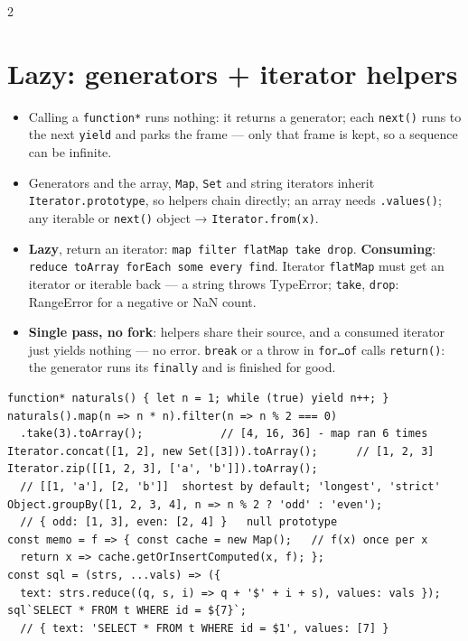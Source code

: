 \documentclass[8pt]{extarticle}
\begin{document}
\begin{multicols}{2}
\section{Lazy: generators + iterator helpers}
\begin{itemize}
  \item Calling a \texttt{function*} runs nothing: it returns a generator; each \texttt{next()}
        runs to the next \texttt{yield} and parks the frame — only that frame is kept, so a
        sequence can be infinite.
  \item Generators and the array, \texttt{Map}, \texttt{Set} and string iterators inherit
        \texttt{Iterator.prototype}, so helpers chain directly; an array needs
        \texttt{.values()}; any iterable or \texttt{next()} object → \texttt{Iterator.from(x)}.
  \item \textbf{Lazy}, return an iterator: \texttt{map filter flatMap take drop}.
        \textbf{Consuming}: \texttt{reduce toArray forEach some every find}. Iterator
        \texttt{flatMap} must get an iterator or iterable back — a string throws TypeError;
        \texttt{take}, \texttt{drop}: RangeError for a negative or NaN count.
  \item \textbf{Single pass, no fork}: helpers share their source, and a consumed iterator
        just yields nothing — no error. \texttt{break} or a throw in \texttt{for…of} calls
        \texttt{return()}: the generator runs its \texttt{finally} and is finished for good.
\end{itemize}

\begin{lstlisting}[style=js]
function* naturals() { let n = 1; while (true) yield n++; }
naturals().map(n => n * n).filter(n => n % 2 === 0)
  .take(3).toArray();            // [4, 16, 36] - map ran 6 times
Iterator.concat([1, 2], new Set([3])).toArray();      // [1, 2, 3]
Iterator.zip([[1, 2, 3], ['a', 'b']]).toArray();
  // [[1, 'a'], [2, 'b']]  shortest by default; 'longest', 'strict'
Object.groupBy([1, 2, 3, 4], n => n % 2 ? 'odd' : 'even');
  // { odd: [1, 3], even: [2, 4] }   null prototype
const memo = f => { const cache = new Map();   // f(x) once per x
  return x => cache.getOrInsertComputed(x, f); };
const sql = (strs, ...vals) => ({
  text: strs.reduce((q, s, i) => q + '$' + i + s), values: vals });
sql`SELECT * FROM t WHERE id = ${7}`;
  // { text: 'SELECT * FROM t WHERE id = $1', values: [7] }
\end{lstlisting}


\end{multicols}
\end{document}
